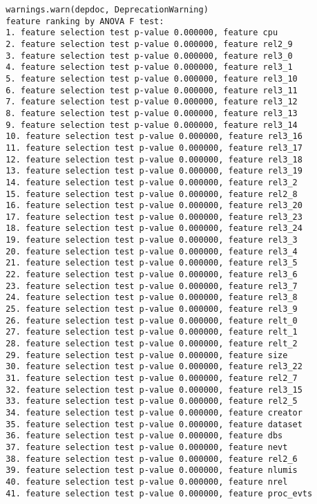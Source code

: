 \begin{verbatim}
  warnings.warn(depdoc, DeprecationWarning)
  feature ranking by ANOVA F test:
  1. feature selection test p-value 0.000000, feature cpu
  2. feature selection test p-value 0.000000, feature rel2_9
  3. feature selection test p-value 0.000000, feature rel3_0
  4. feature selection test p-value 0.000000, feature rel3_1
  5. feature selection test p-value 0.000000, feature rel3_10
  6. feature selection test p-value 0.000000, feature rel3_11
  7. feature selection test p-value 0.000000, feature rel3_12
  8. feature selection test p-value 0.000000, feature rel3_13
  9. feature selection test p-value 0.000000, feature rel3_14
  10. feature selection test p-value 0.000000, feature rel3_16
  11. feature selection test p-value 0.000000, feature rel3_17
  12. feature selection test p-value 0.000000, feature rel3_18
  13. feature selection test p-value 0.000000, feature rel3_19
  14. feature selection test p-value 0.000000, feature rel3_2
  15. feature selection test p-value 0.000000, feature rel2_8
  16. feature selection test p-value 0.000000, feature rel3_20
  17. feature selection test p-value 0.000000, feature rel3_23
  18. feature selection test p-value 0.000000, feature rel3_24
  19. feature selection test p-value 0.000000, feature rel3_3
  20. feature selection test p-value 0.000000, feature rel3_4
  21. feature selection test p-value 0.000000, feature rel3_5
  22. feature selection test p-value 0.000000, feature rel3_6
  23. feature selection test p-value 0.000000, feature rel3_7
  24. feature selection test p-value 0.000000, feature rel3_8
  25. feature selection test p-value 0.000000, feature rel3_9
  26. feature selection test p-value 0.000000, feature relt_0
  27. feature selection test p-value 0.000000, feature relt_1
  28. feature selection test p-value 0.000000, feature relt_2
  29. feature selection test p-value 0.000000, feature size
  30. feature selection test p-value 0.000000, feature rel3_22
  31. feature selection test p-value 0.000000, feature rel2_7
  32. feature selection test p-value 0.000000, feature rel3_15
  33. feature selection test p-value 0.000000, feature rel2_5
  34. feature selection test p-value 0.000000, feature creator
  35. feature selection test p-value 0.000000, feature dataset
  36. feature selection test p-value 0.000000, feature dbs
  37. feature selection test p-value 0.000000, feature nevt
  38. feature selection test p-value 0.000000, feature rel2_6
  39. feature selection test p-value 0.000000, feature nlumis
  40. feature selection test p-value 0.000000, feature nrel
  41. feature selection test p-value 0.000000, feature proc_evts

\end{verbatim}
